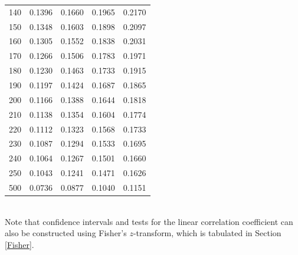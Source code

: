 \begin{minipage}[t]{0.49\textwidth}
\begin{tabular}{rrrrr}
		140 & 0.1396 & 0.1660 & 0.1965 & 0.2170 \\
		150 & 0.1348 & 0.1603 & 0.1898 & 0.2097 \\
		160 & 0.1305 & 0.1552 & 0.1838 & 0.2031 \\
		170 & 0.1266 & 0.1506 & 0.1783 & 0.1971 \\
		180 & 0.1230 & 0.1463 & 0.1733 & 0.1915 \\
		190 & 0.1197 & 0.1424 & 0.1687 & 0.1865 \\[5pt]
		200 & 0.1166 & 0.1388 & 0.1644 & 0.1818 \\
		210 & 0.1138 & 0.1354 & 0.1604 & 0.1774 \\
		220 & 0.1112 & 0.1323 & 0.1568 & 0.1733 \\
		230 & 0.1087 & 0.1294 & 0.1533 & 0.1695 \\
		240 & 0.1064 & 0.1267 & 0.1501 & 0.1660 \\
		250 & 0.1043 & 0.1241 & 0.1471 & 0.1626 \\
		500 & 0.0736 & 0.0877 & 0.1040 & 0.1151 \\
		\midrule
	\end{tabular}
\end{minipage}
\\[5pt]
\noindent Note that confidence intervals and tests for the linear correlation coefficient
can also be constructed using Fisher's $z$-transform, which is tabulated in
Section \ref{Fisher}.
